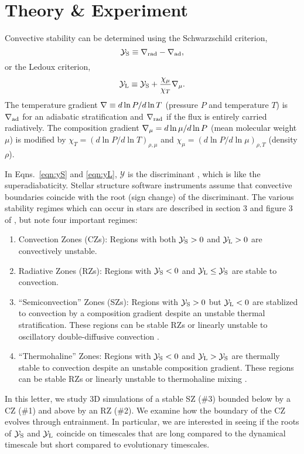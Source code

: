 \section{Theory \& Experiment}
\label{sec:theory}
Convective stability can be determined using the Schwarzschild criterion,
\begin{equation}
    \yS \equiv \gradrad - \gradad,
    \label{eqn:yS}
\end{equation}
or the Ledoux criterion,
\begin{equation}
    \yL \equiv \yS +  \frac{\chi_\mu}{\chi_T}\gradmu.
    \label{eqn:yL}
\end{equation}
The temperature gradient $\nabla \equiv d \ln P / d \ln T$ (pressure $P$ and temperature $T$) is $\nabla_{\rm{ad}}$ for an adiabatic stratification and $\nabla_{\rm{rad}}$ if the flux is entirely carried radiatively.
The composition gradient $\nabla_{\mu} = d\ln\mu/d\ln P$ (mean molecular weight $\mu$) is modified by $\chi_T = (d\ln P / d\ln T)_{\rho,\mu}$ and $\chi_\mu = (d\ln P / d\ln\mu)_{\rho,T}$ (density $\rho$).

In Eqns.~\ref{eqn:yS} and \ref{eqn:yL}, $\mathcal{Y}$ is the discriminant \citep[e.g.,][sec.~2]{mesa4}, which is like the superadiabaticity.
Stellar structure software instruments assume that convective boundaries coincide with the root (sign change) of the discriminant.
The various stability regimes which can occur in stars are described in section 3 and figure 3 of \citet{salaris_cassisi_2017}, but note four important regimes:
\begin{enumerate}
    \item Convection Zones (CZs): Regions with both $\mathcal{Y}_{\rm{S}} > 0$ and $\mathcal{Y}_{\rm{L}} > 0$ are convectively unstable.
    \item Radiative Zones (RZs): Regions with $\mathcal{Y}_{\rm{S}} < 0$ and $\mathcal{Y}_{\rm{L}} \leq \mathcal{Y}_{\rm{S}}$ are stable to convection.
    \item ``Semiconvection'' Zones (SZs): Regions with $\mathcal{Y}_{\rm{S}} > 0$ but $\mathcal{Y}_{\rm{L}} < 0$ are stablized to convection by a composition gradient despite an unstable thermal stratification.
        These regions can be stable RZs or linearly unstable to oscillatory double-diffusive convection \citep[ODDC, see][chapters 2 and 4]{garaud_2018}.
    \item ``Thermohaline'' Zones: Regions with $\mathcal{Y}_{\rm{S}} < 0$ and $\mathcal{Y}_{\rm{L}} > \mathcal{Y}_{\rm{S}}$ are thermally stable to convection despite an unstable composition gradient.
        These regions can be stable RZs or linearly unstable to thermohaline mixing \citep[see][chapters 2 and 3]{garaud_2018}.
\end{enumerate}
In this letter, we study 3D simulations of a stable SZ (\#3) bounded below by a CZ (\#1) and above by an RZ (\#2).
We examine how the boundary of the CZ evolves through entrainment.
In particular, we are interested in seeing if the roots of $\mathcal{Y}_{\rm{S}}$ and $\mathcal{Y}_{\rm{L}}$ coincide on timescales that are long compared to the dynamical timescale but short compared to evolutionary timescales.

